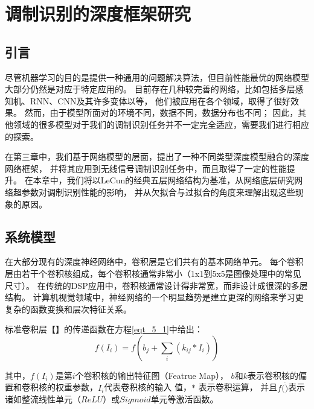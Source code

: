 \chapter{调制识别的深度框架研究}

\section{引言}

尽管机器学习的目的是提供一种通用的问题解决算法，但目前性能最优的网络模型大部分仍然是对应于特定应用的。
目前存在几种较完善的网络，比如包括多层感知机、RNN、CNN及其许多变体以等，
他们被应用在各个领域，取得了很好效果。
然而，由于模型所面对的环境不同，数据不同，数据分布也不同；
因此，其他领域的很多模型对于我们的调制识别任务并不一定完全适应，需要我们进行相应的探索。 \par

在第三章中，我们基于网络模型的层面，提出了一种不同类型深度模型融合的深度网络框架，
并将其应用到无线信号调制识别任务中，而且取得了一定的性能提升。
在本章中，我们将以LeCun的经典五层网络结构为基准，从网络底层研究网络超参数对调制识别性能的影响，
并从欠拟合与过拟合的角度来理解出现这些现象的原因。\par

\section{系统模型}

在大部分现有的深度神经网络中，卷积层是它们共有的基本网络单元。
每个卷积层由若干个卷积核组成，每个卷积核通常非常小（1x1到5x5是图像处理中的常见尺寸）。
在传统的DSP应用中，卷积核通常设计得非常宽，而非设计成很深的多层结构。
计算机视觉领域中，神经网络的一个明显趋势是建立更深的网络来学习更复杂的函数变换和层次特征关系。\par

标准卷积层【】的传递函数在方程\ref{eqt_5_1}中给出：
\begin{equation}
	\label{eqt_5_1}
	f(I_i) = f (b_j + \sum_{i}(k_{ij} * I_i))
\end{equation}

其中，$f(I_i)$是第$i$个卷积核的输出特征图（Featrue Map），
$b$和$k$表示卷积核的偏置和卷积核的权重参数，$I_i$代表卷积核的输入 值，$*$ 表示卷积运算，
并且$f(\dot)$表示诸如整流线性单元（$ReLU$）或$Sigmoid$单元等激活函数。\par

